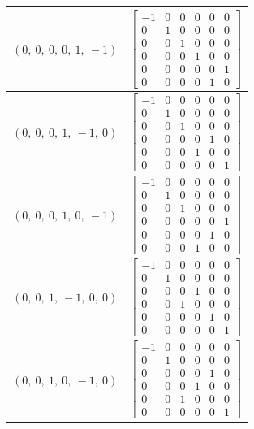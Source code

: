 \documentclass[11pt]{article}
\theoremstyle{definition}
\begin{document}
\begin{longtable}{|l|c|}
    \hline
    $\left( 0, \  0, \  0, \  0, \  1, \  -1\right)$ & ${\left[\begin{matrix}-1 & 0 & 0 & 0 & 0 & 0\\0 & 1 & 0 & 0 & 0 & 0\\0 & 0 & 1 & 0 & 0 & 0\\0 & 0 & 0 & 1 & 0 & 0\\0 & 0 & 0 & 0 & 0 & 1\\0 & 0 & 0 & 0 & 1 & 0\end{matrix}\right]}$ \\
    \hline
    $\left( 0, \  0, \  0, \  1, \  -1, \  0\right)$ & ${\left[\begin{matrix}-1 & 0 & 0 & 0 & 0 & 0\\0 & 1 & 0 & 0 & 0 & 0\\0 & 0 & 1 & 0 & 0 & 0\\0 & 0 & 0 & 0 & 1 & 0\\0 & 0 & 0 & 1 & 0 & 0\\0 & 0 & 0 & 0 & 0 & 1\end{matrix}\right]}$ \\
    \hline
    $\left( 0, \  0, \  0, \  1, \  0, \  -1\right)$ & ${\left[\begin{matrix}-1 & 0 & 0 & 0 & 0 & 0\\0 & 1 & 0 & 0 & 0 & 0\\0 & 0 & 1 & 0 & 0 & 0\\0 & 0 & 0 & 0 & 0 & 1\\0 & 0 & 0 & 0 & 1 & 0\\0 & 0 & 0 & 1 & 0 & 0\end{matrix}\right]}$ \\
    \hline
    $\left( 0, \  0, \  1, \  -1, \  0, \  0\right)$ & ${\left[\begin{matrix}-1 & 0 & 0 & 0 & 0 & 0\\0 & 1 & 0 & 0 & 0 & 0\\0 & 0 & 0 & 1 & 0 & 0\\0 & 0 & 1 & 0 & 0 & 0\\0 & 0 & 0 & 0 & 1 & 0\\0 & 0 & 0 & 0 & 0 & 1\end{matrix}\right]}$ \\
    \hline
    $\left( 0, \  0, \  1, \  0, \  -1, \  0\right)$ & ${\left[\begin{matrix}-1 & 0 & 0 & 0 & 0 & 0\\0 & 1 & 0 & 0 & 0 & 0\\0 & 0 & 0 & 0 & 1 & 0\\0 & 0 & 0 & 1 & 0 & 0\\0 & 0 & 1 & 0 & 0 & 0\\0 & 0 & 0 & 0 & 0 & 1\end{matrix}\right]}$ \\

\end{longtable}
\end{document}
